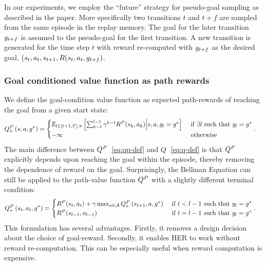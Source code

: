 In our experiments, we employ the ``future'' strategy for pseudo-goal sampling
as described in the paper. More specifically two transitions $t$ and $t+f$ are
sampled from the same episode in the replay memory. The goal for the later
transition $g_{t+f}$ is assumed to the pseudo-goal for the first transition.
A new transition is generated for the time step $t$ with reward re-computed
with $g_{t+f}$ as the desired goal, $(s_{t}, a_t, s_{t+1},
R(s_t, a_t, g_{t+f})$.


\subsubsection{Goal conditioned value function as path rewards}
We define the goal-condition value function as expected path-rewards of reaching
the goal from a given start state:
%
\begin{align}
  \fwargs\state\act{\goal^*}\policy{P}
  &=
    \begin{cases}
      \E_{l \in [t+1, T], \policy}\left[ \sum_{k=t}^{l-1}
  \discount^{k-t} \Rew^P(\state_k, \act_k)
  \middle| \state, \act, \goal_l = \goal^* \right]
& \text{ if } \exists l \text{ such that } \goal_l = \goal^*
\\
-\infty & \text{ otherwise }
\end{cases}.
  \label{eq:qp-def}
\end{align}%
% 
The main difference between $Q^P$~\eqref{eq:qp-def} and $Q$~\eqref{eq:q-def}
is that $Q^P$ explicitly depends upon reaching the goal within the episode,
thereby removing the dependence of reward on the goal. Surprisingly, the Bellman
Equation can still be applied to the path-value function $Q^P$ with a slightly
different terminal condition:
%
\begin{align}
  \fwargs{\state_t}{\act_t}{\goal^*}*P
  &=
    \begin{cases}
      \Rew^P(\state_t, \act_t) + \discount \max_{\act \in \Action} \fwargs{\state_{t+1}}\act{\goal^*}*P
      & \text{ if } t < l-1 \text{ such that } \goal_l = \goal^*
      \\
      \Rew^P(\state_{l-1}, \act_{l-1}) & \text{ if } t = l-1 \text{ such that } \goal_l = \goal^*
    \end{cases}.
  \label{eq:bellman-path}
\end{align}%
% 
This formulation has several advantages. Firstly, it removes a design decision
about the choice of goal-reward. Secondly, it enables HER to work without reward
re-computation. This can be especially useful when reward computation is expensive.

